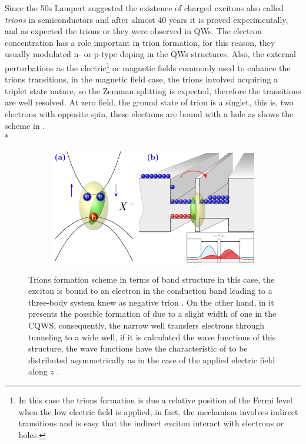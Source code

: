 Since the 50s Lampert\cite{lampert1958mobile} suggested the existence of charged excitons also called \emph{trions} in semiconductors and after almost 40 years it is proved experimentally\cite{kheng1993observation,stebe1989ground}, and as expected the trions \xp or \xm they were observed in QWs. The electron concentration has a role important in trion formation, for this reason, they usually modulated n- or p-type doping in the QWs structures.  
Also, the external perturbations as the electric\footnote{In this case the trions formation is due a relative position of the Fermi level when the low electric field is applied, in fact, the mechanism involves indirect transitions and is easy that the indirect exciton interact with electrons or holes\cite{yuan2018tunneling}.} or magnetic fields commonly used to enhance the trions transitions, in the magnetic field case, the trions involved acquiring a triplet state nature, so the Zemman splitting is expected, therefore the transitions are well resolved. At zero field, the ground state of trion is a singlet\cite{aceituno2011therole}, this is, two electrons with opposite spin, these electrons are bound with a hole as shows the scheme in . \\*
\begin{figure}[ht!]
	\centering
	\begin{subfigure}{\textwidth}
		\includegraphics[width=\textwidth]{../figures/chapter-3/trions-scheme/build-ruco/trions-sheme}
		\label{subfig:chapter-4-trions-scheme-a)}
		\label{subfig:chapter-4-trions-scheme-b)}
	\end{subfigure}
	\caption{Trions formation scheme in terms of band structure  in this case, the exciton is bound to an electron in the conduction band leading to a three-body system knew as negative trion \xm.  On the other hand, in  it presents the possible formation of \xm due to a slight width of one in the CQWS, consequently, the narrow well transfers electrons through tunneling to a wide well, if it is calculated the wave functions of this structure, the wave functions have the characteristic of to be distributed asymmetrically as in the case of the applied electric field along $z$ \cite{sivalertporn2016effectofbarrier,debbar1989coupled}.  }
	\label{fig:chapter-4-trions-scheme}
\end{figure}

